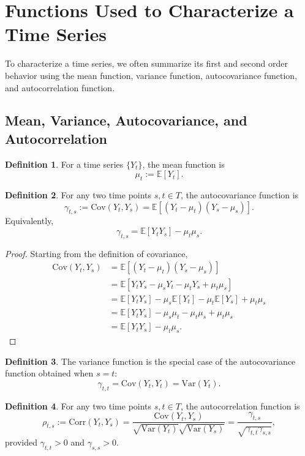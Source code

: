 \documentclass[12pt,oneside]{book}
\numberwithin{equation}{section}
\theoremstyle{definition}
\newtheorem{definition}{Definition}[section]
\theoremstyle{plain}
\theoremstyle{remark}
\newcommand{\E}{\mathbb{E}}
\newcommand{\Var}{\mathrm{Var}}
\newcommand{\Cov}{\mathrm{Cov}}
\newcommand{\Corr}{\mathrm{Corr}}
\begin{document}
\section{Functions Used to Characterize a Time Series}

To characterize a time series, we often summarize its first and second order behavior using the mean function, variance function, autocovariance function, and autocorrelation function.

\subsection{Mean, Variance, Autocovariance, and Autocorrelation}

\begin{definition}
For a time series $\{Y_t\}$, the mean function is
\[
\mu_t := \E[Y_t].
\]
\end{definition}

\begin{definition}
For any two time points $s,t \in T$, the autocovariance function is
\[
\gamma_{t,s}
:=
\Cov(Y_t,Y_s)
=
\E[(Y_t-\mu_t)(Y_s-\mu_s)].
\]
Equivalently,
\[
\gamma_{t,s}
=
\E[Y_tY_s]-\mu_t\mu_s.
\]
\end{definition}

\begin{proof}
Starting from the definition of covariance,
\begin{align*}
\Cov(Y_t,Y_s)
&=
\E[(Y_t-\mu_t)(Y_s-\mu_s)] \\
&=
\E[Y_tY_s-\mu_sY_t-\mu_tY_s+\mu_t\mu_s] \\
&=
\E[Y_tY_s]-\mu_s\E[Y_t]-\mu_t\E[Y_s]+\mu_t\mu_s \\
&=
\E[Y_tY_s]-\mu_s\mu_t-\mu_t\mu_s+\mu_t\mu_s \\
&=
\E[Y_tY_s]-\mu_t\mu_s.
\end{align*}
\end{proof}

\begin{definition}
The variance function is the special case of the autocovariance function obtained when $s=t$:
\[
\gamma_{t,t}
=
\Cov(Y_t,Y_t)
=
\Var(Y_t).
\]
\end{definition}

\begin{definition}
For any two time points $s,t\in T$, the autocorrelation function is
\[
\rho_{t,s}
:=
\Corr(Y_t,Y_s)
=
\frac{\Cov(Y_t,Y_s)}
{\sqrt{\Var(Y_t)}\sqrt{\Var(Y_s)}}
=
\frac{\gamma_{t,s}}{\sqrt{\gamma_{t,t}\gamma_{s,s}}},
\]
provided $\gamma_{t,t}>0$ and $\gamma_{s,s}>0$.
\end{definition}
\end{document}
